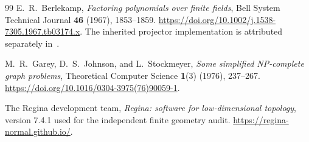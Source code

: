 \begin{thebibliography}{99}
E.~R.~Berlekamp, \emph{Factoring polynomials over finite fields},
Bell System Technical Journal \textbf{46} (1967), 1853--1859.
\url{https://doi.org/10.1002/j.1538-7305.1967.tb03174.x}.
The inherited projector implementation is attributed separately
in~\cite{projectors}.

M.~R.~Garey, D.~S.~Johnson, and L.~Stockmeyer,
\emph{Some simplified NP-complete graph problems},
Theoretical Computer Science \textbf{1}(3) (1976), 237--267.
\url{https://doi.org/10.1016/0304-3975(76)90059-1}.

The Regina development team, \emph{Regina: software for low-dimensional
topology}, version 7.4.1 used for the independent finite geometry audit.
\url{https://regina-normal.github.io/}.
\end{thebibliography}

